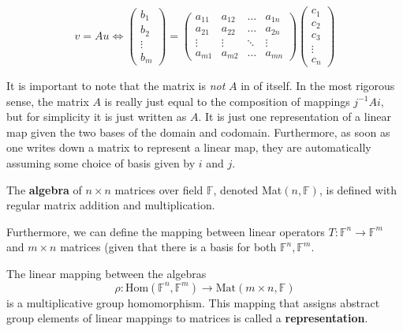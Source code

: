   \begin{equation}
    v = A u \iff 
    \begin{pmatrix}
     b_1 \\ b_2 \\ \vdots \\ b_m
    \end{pmatrix}
    = \begin{pmatrix}
     a_{1 1} & a_{1 2} & \ldots & a_{1 n} \\
     a_{2 1} & a_{2 2} & \ldots & a_{2 n} \\
     \vdots & \vdots & \ddots & \vdots \\
     a_{m 1} & a_{m 2} & \ldots & a_{m n} 
    \end{pmatrix} \begin{pmatrix}
     c_1 \\ c_2 \\ c_3 \\ \vdots \\ c_n
    \end{pmatrix}
  \end{equation}

  It is important to note that the matrix is \textit{not} $A$ in of itself. In the most rigorous sense, the matrix $A$ is really just equal to the composition of mappings $ j^{-1} A i$, but for simplicity it is just written as $A$. It is just one representation of a linear map given the two bases of the domain and codomain. Furthermore, as soon as one writes down a matrix to represent a linear map, they are automatically assuming some choice of basis given by $i$ and $j$. 

  \begin{definition}
    The \textbf{algebra} of $n \times n$ matrices over field $\mathbb{F}$, denoted Mat$(n, \mathbb{F})$, is defined with regular matrix addition and multiplication. 
  \end{definition}

  Furthermore, we can define the mapping between linear operators $T: \mathbb{F}^n \longrightarrow \mathbb{F}^m$ and $m \times n$ matrices (given that there is a basis for both $\mathbb{F}^n, \mathbb{F}^m$. 

  \begin{definition}
    The linear mapping between the algebras 
    \begin{equation}
      \rho: \text{Hom}(\mathbb{F}^n, \mathbb{F}^m) \longrightarrow \text{Mat}(m \times n, \mathbb{F})
    \end{equation}
    is a multiplicative group homomorphism. This mapping that assigns abstract group elements of linear mappings to matrices is called a \textbf{representation}. 
  \end{definition}

